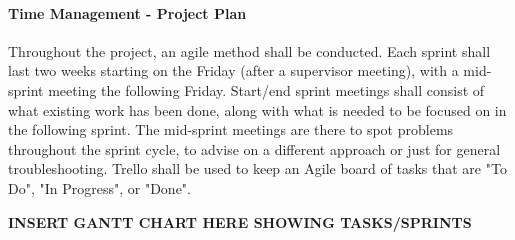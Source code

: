 \documentclass{article}
\begin{document}
    \paragraph{Time Management - Project Plan}
    
    Throughout the project, an agile method shall be conducted. Each sprint shall last two weeks
    starting on the Friday (after a supervisor meeting), 
    with a mid-sprint meeting the following Friday. Start/end sprint meetings shall consist of what existing work has been done, along with what is needed to be focused on in the following sprint. The mid-sprint meetings
    are there to spot problems throughout the sprint cycle, to advise on a different approach or just for general troubleshooting. Trello shall be used to keep an Agile board of tasks that are "To Do", "In Progress",
    or "Done". 

    \textbf{INSERT GANTT CHART HERE SHOWING TASKS/SPRINTS}
    
\end{document}
